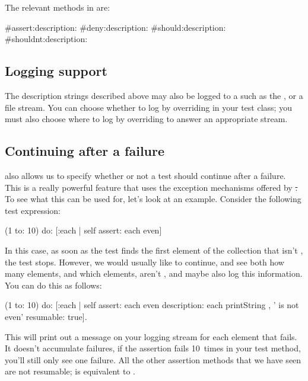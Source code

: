 \documentclass[a4paper,10pt,twoside]{book}
\begin{document}
The relevant methods in  are:
\begin{code}{}
#assert:description:
#deny:description:
#should:description:
#shouldnt:description:
\end{code}

\subsection{Logging support}
The description strings described above may also be logged to a  such as the , or a file stream.
You can choose whether to log by overriding  in your test class; you must also choose where to log by overriding  to answer an appropriate stream.

\subsection{Continuing after a failure}
\sunit also allows us to specify whether or not a test should continue after a failure.
This is a really powerful feature that uses the exception mechanisms offered by \st.
To see what this can be used for, let's look at an example.
Consider the following test expression:
\begin{code}{}
(1 to: 10) do: [:each | self assert: each even]
\end{code}
In this case, as soon as the test finds the first element of the collection that isn't , the test stops.
However, we would usually like to continue, and see both how many elements, and which elements, aren't , and maybe also log this information.
You can do this as follows:
\begin{code}{}
(1 to: 10) do: [:each |
	self
		assert: each even
		description: each printString , ' is not even'
		resumable: true].
\end{code}
This will print out a message on your logging stream for each element that fails.
It doesn't accumulate failures, \ie if the assertion fails 10~times in your test method, you'll still only see one failure.
All the other assertion methods that we have seen are not resumable;  is equivalent to .
\end{document}
